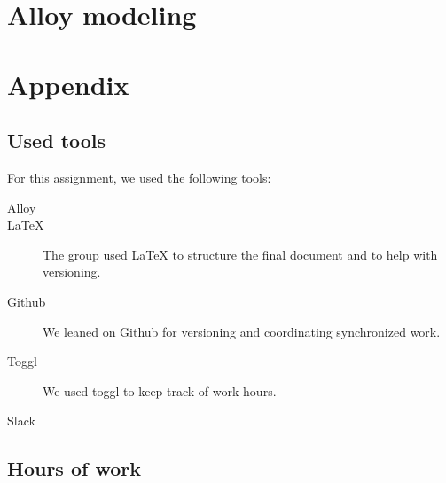 \documentclass{article}
\begin{document}
	\newpage
	\section{Alloy modeling}

	\newpage
	\section{Appendix}
		\listoffigures
		\listoftables
		
		\subsection{Used tools}
		For this assignment, we used the following tools:
		
		\begin{description}
			\item [Alloy]
			\item [LaTeX] The group used LaTeX to structure the final document and to help with versioning.
			\item [Github] We leaned on Github for versioning and coordinating synchronized work.
			\item [Toggl] We used toggl to keep track of work hours.
			\item [Slack]  
			
		\end{description}
		
		\subsection{Hours of work}
\end{document}

